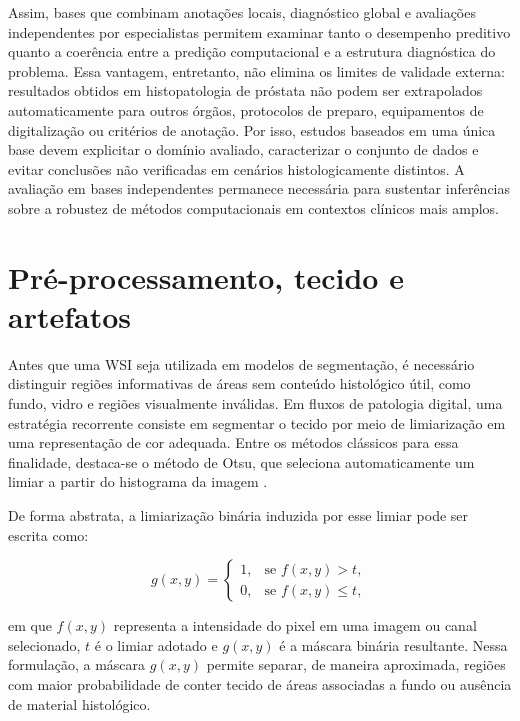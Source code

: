 Assim, bases que combinam anotações locais, diagnóstico global e avaliações independentes por especialistas permitem examinar tanto o desempenho preditivo quanto a coerência entre a predição computacional e a estrutura diagnóstica do problema. Essa vantagem, entretanto, não elimina os limites de validade externa: resultados obtidos em histopatologia de próstata não podem ser extrapolados automaticamente para outros órgãos, protocolos de preparo, equipamentos de digitalização ou critérios de anotação. Por isso, estudos baseados em uma única base devem explicitar o domínio avaliado, caracterizar o conjunto de dados e evitar conclusões não verificadas em cenários histologicamente distintos. A avaliação em bases independentes permanece necessária para sustentar inferências sobre a robustez de métodos computacionais em contextos clínicos mais amplos.

\section{Pré-processamento, tecido e artefatos}\label{sec:preprocessamento_patologia} 

Antes que uma WSI seja utilizada em modelos de segmentação, é necessário distinguir regiões informativas de áreas sem conteúdo histológico útil, como fundo, vidro e regiões visualmente inválidas. Em fluxos de patologia digital, uma estratégia recorrente consiste em segmentar o tecido por meio de limiarização em uma representação de cor adequada. Entre os métodos clássicos para essa finalidade, destaca-se o método de Otsu, que seleciona automaticamente um limiar a partir do histograma da imagem \cite{otsu1979threshold}. 

De forma abstrata, a limiarização binária induzida por esse limiar pode ser escrita como: 

\begin{equation}\label{eq:otsu-threshold} g(x,y) = \begin{cases} 1, & \text{se } f(x,y) > t,\\ 0, & \text{se } f(x,y) \leq t, \end{cases} \end{equation} 

em que $f(x,y)$ representa a intensidade do pixel em uma imagem ou canal selecionado, $t$ é o limiar adotado e $g(x,y)$ é a máscara binária resultante. Nessa formulação, a máscara $g(x,y)$ permite separar, de maneira aproximada, regiões com maior probabilidade de conter tecido de áreas associadas a fundo ou ausência de material histológico. 

